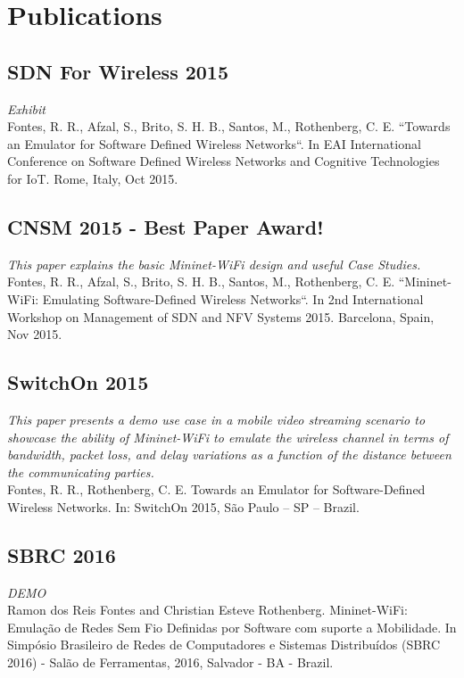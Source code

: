 \chapter{Publications}

\section{SDN For Wireless 2015}
\textit{Exhibit}\\
Fontes, R. R., Afzal, S., Brito, S. H. B., Santos, M., Rothenberg, C. E. “Towards an Emulator for Software Defined Wireless Networks“. In EAI International Conference on Software Defined Wireless Networks and Cognitive Technologies for IoT. Rome, Italy, Oct 2015.

\section{CNSM 2015 - Best Paper Award!}
\textit{This paper explains the basic Mininet-WiFi design and useful Case Studies.}
\\
Fontes, R. R., Afzal, S., Brito, S. H. B., Santos, M., Rothenberg, C. E. “Mininet-WiFi: Emulating Software-Defined Wireless Networks“. In 2nd International Workshop on Management of SDN and NFV Systems 2015. Barcelona, Spain, Nov 2015.

\section{SwitchOn 2015}
\textit{This paper presents a demo use case in a mobile video streaming scenario to showcase the ability of Mininet-WiFi to emulate the wireless channel in terms of bandwidth, packet loss, and delay variations as a function of the distance between the communicating parties.}\\
Fontes, R. R., Rothenberg, C. E. Towards an Emulator for Software-Defined Wireless Networks. In: SwitchOn 2015, São Paulo – SP – Brazil.

\section{SBRC 2016}
\textit{DEMO}\\
Ramon dos Reis Fontes and Christian Esteve Rothenberg. Mininet-WiFi: Emulação de Redes Sem Fio Definidas por Software com suporte a Mobilidade. In Simpósio Brasileiro de Redes de Computadores e Sistemas Distribuídos (SBRC 2016) - Salão de Ferramentas, 2016, Salvador - BA - Brazil.

